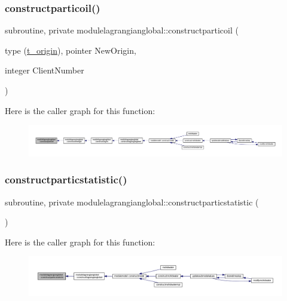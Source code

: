 \subsubsection{\texorpdfstring{constructparticoil()}{constructparticoil()}}
{\footnotesize\ttfamily subroutine, private modulelagrangianglobal\+::constructparticoil (\begin{DoxyParamCaption}\item[{type (\mbox{\hyperlink{structmodulelagrangianglobal_1_1t__origin}{t\+\_\+origin}}), pointer}]{New\+Origin,  }\item[{integer}]{Client\+Number }\end{DoxyParamCaption})\hspace{0.3cm}{\ttfamily [private]}}

Here is the caller graph for this function\+:\nopagebreak
\begin{figure}[H]
\begin{center}
\leavevmode
\includegraphics[width=350pt]{namespacemodulelagrangianglobal_a070a6d8670eb489aaa0ce90aba70b1cc_icgraph}
\end{center}
\end{figure}
\mbox{\label{namespacemodulelagrangianglobal_a13c381524822a2310bb011dc1680ed61}} 
\subsubsection{\texorpdfstring{constructparticstatistic()}{constructparticstatistic()}}
{\footnotesize\ttfamily subroutine, private modulelagrangianglobal\+::constructparticstatistic (\begin{DoxyParamCaption}{ }\end{DoxyParamCaption})\hspace{0.3cm}{\ttfamily [private]}}

Here is the caller graph for this function\+:\nopagebreak
\begin{figure}[H]
\begin{center}
\leavevmode
\includegraphics[width=350pt]{namespacemodulelagrangianglobal_a13c381524822a2310bb011dc1680ed61_icgraph}
\end{center}
\end{figure}
\mbox{\label{namespacemodulelagrangianglobal_ace8bf8bfcb4ec7384b2bb7af77034f8e}} 

